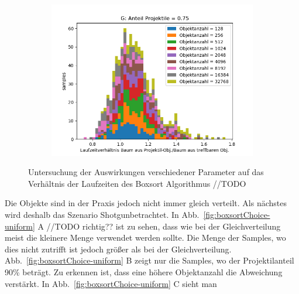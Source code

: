 \begin{figure}
\begin{subfigure}[t]{0.55\textwidth}
		\label{fig:boxsortChoice-shotgun-F}
	\end{subfigure}
~
	\begin{subfigure}[t]{0.55\textwidth}
		\centering
		\includegraphics[width=1\textwidth]{./res/boxsortChoice-shotgun-G.png}

		\label{fig:boxsortChoice-shotgun-G}
	\end{subfigure}

	\caption{Untersuchung der Auswirkungen verschiedener Parameter auf das Verhältnis der Laufzeiten des Boxsort Algorithmus //TODO}
	\label{fig:boxsortChoice-shotgun}
\end{figure}

Die Objekte sind in der Praxis jedoch nicht immer gleich verteilt. Als nächstes wird deshalb das Szenario \glqq Shotgun\grqq betrachtet.
 In Abb.~\ref{fig:boxsortChoice-uniform} A //TODO richtig?? ist zu sehen, dass wie bei der Gleichverteilung meist die kleinere Menge verwendet werden sollte.
 Die Menge der Samples, wo dies nicht zutrifft ist jedoch größer als bei der Gleichverteilung. Abb.~\ref{fig:boxsortChoice-uniform} B zeigt nur die Samples, wo der Projektilanteil 90\% beträgt. Zu erkennen ist, dass eine höhere Objektanzahl die Abweichung verstärkt. In Abb.~\ref{fig:boxsortChoice-uniform} C sieht man\\


